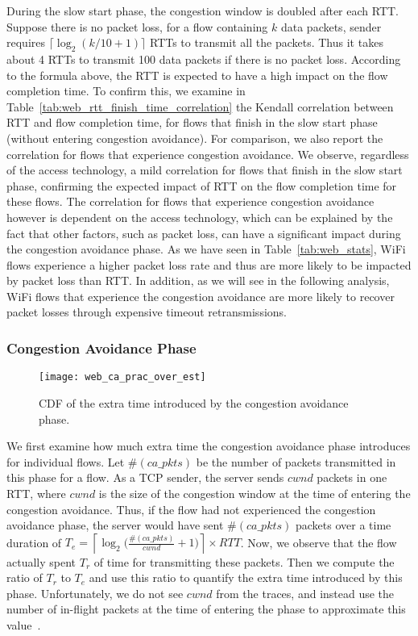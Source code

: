 During the slow start phase, the congestion window is doubled after each RTT. Suppose there is no packet loss, for a flow containing $k$ data packets, sender requires $\lceil{\log_2 (k/10+1)}\rceil$ RTTs to transmit all the packets. Thus it takes about 4 RTTs to transmit 100 data packets if there is no packet loss. According to the formula above, the RTT is expected to have a high impact on the flow completion time. To confirm this, we examine in Table~\ref{tab:web_rtt_finish_time_correlation} the Kendall correlation between RTT and flow completion time, for flows that finish in the slow start phase (\ie without entering congestion avoidance). For comparison, we also report the correlation for flows that experience congestion avoidance. We observe, regardless of the access technology, a mild correlation for flows that finish in the slow start phase, confirming the expected impact of RTT on the flow completion time for these flows. The correlation for flows that experience congestion avoidance however is dependent on the access technology, which can be explained by the fact that other factors, such as packet loss, can have a significant impact during the congestion avoidance phase. As we have seen in Table~\ref{tab:web_stats}, WiFi flows experience a higher packet loss rate and thus are more likely to be impacted by packet loss than RTT. In addition, as we will see in the following analysis, WiFi flows that experience the congestion avoidance are more likely to recover packet losses through expensive timeout retransmissions.

\subsubsection{Congestion Avoidance Phase}

\begin{figure}[th]
\centering
\texttt{[image: web\_ca\_prac\_over\_est]}
\caption{CDF of the extra time introduced by the congestion avoidance phase.}
\label{fig:web_ca_round}
\minsqueeze
\end{figure}

We first examine how much extra time the congestion avoidance phase introduces for individual flows. Let $\#(ca\_pkts)$ be the number of packets transmitted in this phase for a flow. As a TCP sender, the server sends $cwnd$ packets in one RTT, where $cwnd$ is the size of the congestion window at the time of entering the congestion avoidance. Thus, if the flow had not experienced the congestion avoidance phase, the server would have sent $\#(ca\_pkts)$ packets over a time duration of $T_e =  \left \lceil{ \log_2 (\frac{\#(ca\_pkts)}{cwnd}}+1) \right \rceil \times RTT$. Now, we observe that the flow actually spent $T_r$ of time for transmitting these packets. Then we compute the ratio of  $T_r$ to $T_e$ and use this ratio to quantify the extra time introduced by this phase. Unfortunately, we do not see $cwnd$ from the traces, and instead use the number of in-flight packets at the time of entering the phase to approximate this value~\cite{rfc56812009tcp}. 
 
